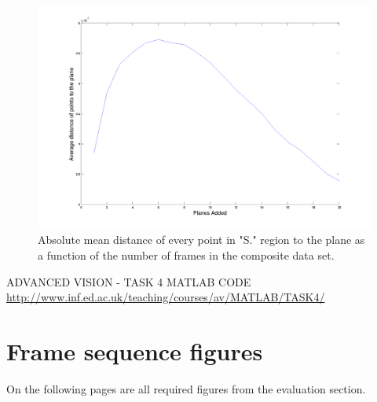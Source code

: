 \documentclass[12pt,a4paper,onecolumn]{article}
\begin{document}
\begin{figure}[h]
  \centering
  \includegraphics[width=1\textwidth]{figs/plane_angle_error_versus_foundation_plane}
  \caption{Absolute mean distance of every point in "S." region to the plane as a function of the number of frames in the composite data set.}
  \label{fig:plane_angle_error_versus_foundation_plane}
\end{figure}

\begin{thebibliography}{9}
  
  ADVANCED VISION - TASK 4 MATLAB CODE
  \url{http://www.inf.ed.ac.uk/teaching/courses/av/MATLAB/TASK4/} 
  
\end{thebibliography}

\appendix

\section{Frame sequence figures}
On the following pages are all required figures from the evaluation section.
\end{document}
